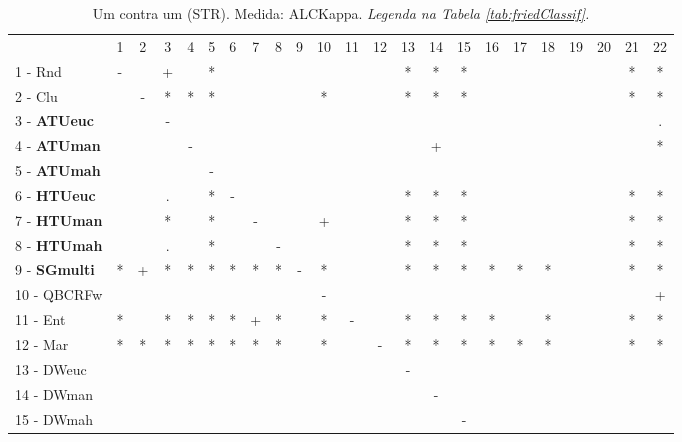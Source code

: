 \begin{table}[h]
\caption{Um contra um (STR). Medida: ALCKappa. \textit{Legenda na Tabela \ref{tab:friedClassif}.}}
\begin{center}\begin{tabular}{lcc|cc|cc|cc|cc|cc|cc|cc|cc|cc|cc}
 			& 1 & 2 & 3 & 4 & 5 & 6 & 7 & 8 & 9 & 10 & 11 & 12 & 13 & 14 & 15 & 16 & 17 & 18 & 19 & 20 & 21 & 22\\
1 - Rnd  	& - &   & + &   & * &   &   &   &   &   &   &   & * & * & * &   &   &   &   &   & * & * \\
2 - Clu  	&   & - & * & * & * &   &   &   &   & * &   &   & * & * & * &   &   &   &   &   & * & * \\ \hline
3 - \textbf{ATUeuc}	&   &   & - &   &   &   &   &   &   &   &   &   &   &   &   &   &   &   &   &   &   & . \\
4 - \textbf{ATUman}	&   &   &   & - &   &   &   &   &   &   &   &   &   & + &   &   &   &   &   &   &   & * \\ \hline
5 - \textbf{ATUmah}	&   &   &   &   & - &   &   &   &   &   &   &   &   &   &   &   &   &   &   &   &   &   \\
6 - \textbf{HTUeuc}	&   &   & . &   & * & - &   &   &   &   &   &   & * & * & * &   &   &   &   &   & * & * \\ \hline
7 - \textbf{HTUman}	&   &   & * &   & * &   & - &   &   & + &   &   & * & * & * &   &   &   &   &   & * & * \\
8 - \textbf{HTUmah}	&   &   & . &   & * &   &   & - &   &   &   &   & * & * & * &   &   &   &   &   & * & * \\ \hline
9 - \textbf{SGmulti}	& * & + & * & * & * & * & * & * & - & * &   &   & * & * & * & * & * & * &   &   & * & * \\
10 - QBCRFw	&   &   &   &   &   &   &   &   &   & - &   &   &   &   &   &   &   &   &   &   &   & + \\ \hline
11 - Ent  	& * &   & * & * & * & * & + & * &   & * & - &   & * & * & * & * &   & * &   &   & * & * \\
12 - Mar  	& * & * & * & * & * & * & * & * &   & * &   & - & * & * & * & * & * & * &   &   & * & * \\ \hline
13 - DWeuc	&   &   &   &   &   &   &   &   &   &   &   &   & - &   &   &   &   &   &   &   &   &   \\
14 - DWman	&   &   &   &   &   &   &   &   &   &   &   &   &   & - &   &   &   &   &   &   &   &   \\ \hline
15 - DWmah	&   &   &   &   &   &   &   &   &   &   &   &   &   &   & - &   &   &   &   &   &   &   \\

\end{tabular}
\end{center}
\end{table}
